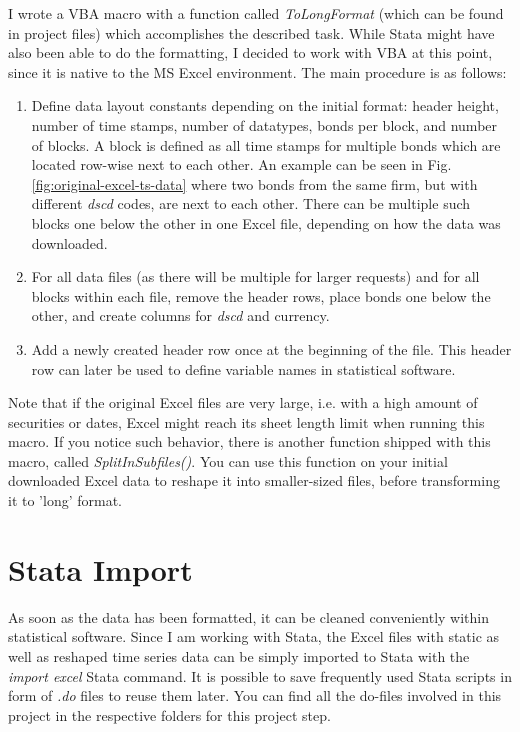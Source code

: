 I wrote a VBA macro with a function called \textit{ToLongFormat} (which can be found in project files) which accomplishes the described task. While Stata might have also been able to do the formatting, I decided to work with VBA at this point, since it is native to the MS Excel environment. The main procedure is as follows: 
\begin{enumerate}
	\item Define data layout constants depending on the initial format: header height, number of time stamps, number of datatypes, bonds per block, and number of blocks. A block is defined as all time stamps for multiple bonds which are located row-wise next to each other. An example can be seen in Fig. \ref{fig:original-excel-ts-data} where two bonds from the same firm, but with different \textit{dscd} codes, are next to each other. There can be multiple such blocks one below the other in one Excel file, depending on how the data was downloaded. 
	\item For all data files (as there will be multiple for larger requests) and for all blocks within each file, remove the header rows, place bonds one below the other, and create columns for \textit{dscd} and currency. 
	\item Add a newly created header row once at the beginning of the file. This header row can later be used to define variable names in statistical software. 
\end{enumerate}

Note that if the original Excel files are very large, i.e. with a high amount of securities or dates, Excel might reach its sheet length limit when running this macro. If you notice such behavior, there is another function shipped with this macro, called \textit{SplitInSubfiles()}. You can use this function on your initial downloaded Excel data to reshape it into smaller-sized files, before transforming it to 'long' format. 

\section{Stata Import} \label{section:data-cleaning}
As soon as the data has been formatted, it can be cleaned conveniently within statistical software. Since I am working with Stata, the Excel files with static as well as reshaped time series data can be simply imported to Stata with the \textit{import excel} Stata command. It is possible to save frequently used Stata scripts in form of \textit{.do} files to reuse them later. You can find all the do-files involved in this project in the respective folders for this project step. 

